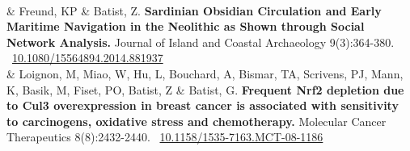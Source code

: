 \documentclass[11pt, a4paper]{article}
\newcommand{\LastName}{Batist}
\newcommand{\Initials}{Z}
\newcommand{\Me}{\LastName, \Initials}
\newcommand{\KyleFreund}{Freund, KP}
\newcommand{\MartinLoignon}{Loignon, M}
\newcommand{\WeiminMiao}{Miao, W}
\newcommand{\LianggaoHu}{Hu, L}
\newcommand{\TarekBismar}{Bismar, TA}
\newcommand{\JamesScrivens}{Scrivens, PJ}
\newcommand{\KorenMann}{Mann, K}
\newcommand{\MarkBasik}{Basik, M}
\newcommand{\AmelieBouchard}{Bouchard, A}
\newcommand{\PierreFiset}{Fiset, PO}
\newcommand{\GeraldBatist}{Batist, G}
\newcommand{\DOI}[1]{\newline \aiDoi\ \href{https://doi.org/#1}{#1}}
\newcommand{\Year}[1]{\fontsize{10pt}{0}\selectfont #1}
\begin{document}
\begin{EntriesTable}
  \\
\Year{2014}  &
  \KyleFreund { \&} \Me.
  \textbf{Sardinian Obsidian Circulation and Early Maritime Navigation in the Neolithic as Shown through Social Network Analysis.}
  Journal of Island and Coastal Archaeology
  9(3):364-380.
  \DOI{10.1080/15564894.2014.881937}
  \\
\Year{2009}  &
  \MartinLoignon, \WeiminMiao, \LianggaoHu, \AmelieBouchard, \TarekBismar, \JamesScrivens, \KorenMann, \MarkBasik, \PierreFiset, \Me { \&} \GeraldBatist.
  \textbf{Frequent Nrf2 depletion due to Cul3 overexpression in breast cancer is associated with sensitivity to carcinogens, oxidative stress and chemotherapy.}
  Molecular Cancer Therapeutics
  8(8):2432-2440.
  \DOI{10.1158/1535-7163.MCT-08-1186}
\end{EntriesTable}
\end{document}

